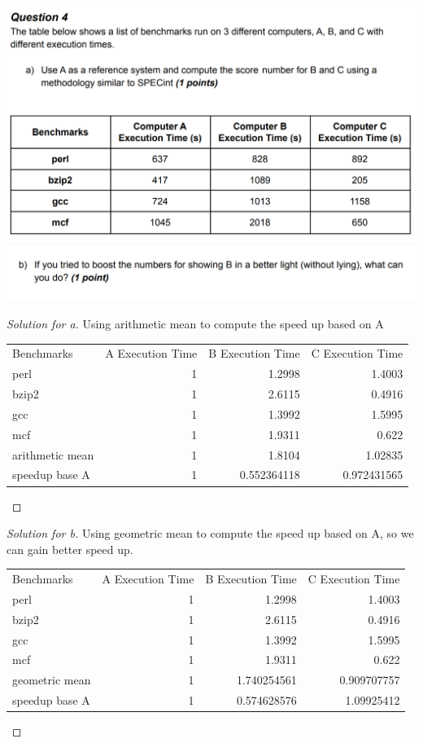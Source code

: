 \documentclass[12pt]{article}
\begin{document}
\includegraphics[scale=0.35]{4_1.png}\\
\includegraphics[scale=0.35]{4_2.png}\\
\begin{proof}[Solution for a]
	Using arithmetic mean to compute the speed up based on A\\
	\centering
	\begin{tabular}{lrrr}
		Benchmarks & \multicolumn{1}{l}{ A Execution Time} & \multicolumn{1}{l}{ B Execution Time} & \multicolumn{1}{l}{C Execution Time } \\
		perl  & 1     & 1.2998 & 1.4003 \\
		bzip2 & 1     & 2.6115 & 0.4916 \\
		gcc   & 1     & 1.3992 & 1.5995 \\
		mcf   & 1     & 1.9311 & 0.622 \\
		arithmetic mean & 1     & 1.8104 & 1.02835 \\
		speedup base A & 1     & 0.552364118 & 0.972431565 \\
	\end{tabular}%
\end{proof}

\begin{proof}[Solution for b]
	Using geometric mean to compute the speed up based on A, so we can gain better speed up.\\
	\centering
 	\begin{tabular}{lrrr}
 		Benchmarks & \multicolumn{1}{l}{ A Execution Time} & \multicolumn{1}{l}{ B Execution Time} & \multicolumn{1}{l}{C Execution Time } \\
 		perl  & 1     & 1.2998 & 1.4003 \\
 		bzip2 & 1     & 2.6115 & 0.4916 \\
 		gcc   & 1     & 1.3992 & 1.5995 \\
 		mcf   & 1     & 1.9311 & 0.622 \\
 		geometric mean & 1     & 1.740254561 & 0.909707757 \\
 		speedup base A & 1     & 0.574628576 & 1.09925412 \\
 	\end{tabular}%
\end{proof}
\end{document}
